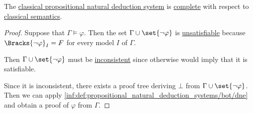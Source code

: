 \begin{theorem}\label{thm:classical_propositional_completeness}
  The \hyperref[def:propositional_natural_deduction_systems]{classical propositional natural deduction system} is \hyperref[def:abstract_logic/completeness]{complete} with respect to \hyperref[def:propositional_semantics/classical]{classical semantics}.
\end{theorem}
\begin{proof}
  Suppose that \( \Gamma \vDash \varphi \). Then the set \( \Gamma \cup \set{ \neg \varphi } \) is \hyperref[def:satisfiable_set_of_sentences]{unsatisfiable} because \( \Bracks{\neg \varphi}_I = F \) for every model \( I \) of \( \Gamma \).

  Then \( \Gamma \cup \set{ \neg \varphi } \) must be \hyperref[def:consistent_set_of_sentences]{inconsistent} since otherwise  would imply that it is satisfiable.

  Since it is inconsistent, there exists a proof tree deriving \( \bot \) from \( \Gamma \cup \set{ \neg \varphi } \). Then we can apply \ref{inf:def:propositional_natural_deduction_systems/bot/dne} and obtain a proof of \( \varphi \) from \( \Gamma \).
\end{proof}
